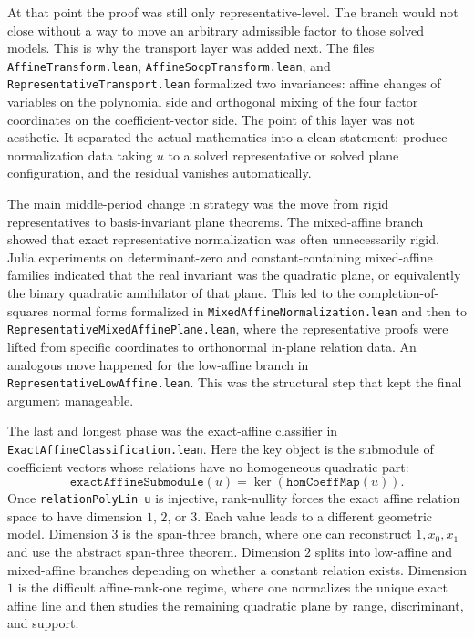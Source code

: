 \documentclass[10pt]{article}
\begin{document}
At that point the proof was still only representative-level. The branch would
not close without a way to move an arbitrary admissible factor to those solved
models. This is why the transport layer was added next. The files
\texttt{AffineTransform.lean}, \texttt{AffineSocpTransform.lean}, and
\texttt{RepresentativeTransport.lean} formalized two invariances: affine
changes of variables on the polynomial side and orthogonal mixing of the four
factor coordinates on the coefficient-vector side. The point of this layer was
not aesthetic. It separated the actual mathematics into a clean statement:
produce normalization data taking $u$ to a solved representative or solved
plane configuration, and the residual vanishes automatically.

The main middle-period change in strategy was the move from rigid
representatives to basis-invariant plane theorems. The mixed-affine branch
showed that exact representative normalization was often unnecessarily rigid.
Julia experiments on determinant-zero and constant-containing mixed-affine
families indicated that the real invariant was the quadratic plane, or
equivalently the binary quadratic annihilator of that plane. This led to the
completion-of-squares normal forms formalized in
\texttt{MixedAffineNormalization.lean} and then to
\texttt{RepresentativeMixedAffinePlane.lean}, where the representative proofs
were lifted from specific coordinates to orthonormal in-plane relation data.
An analogous move happened for the low-affine branch in
\texttt{RepresentativeLowAffine.lean}. This was the structural step that kept
the final argument manageable.

The last and longest phase was the exact-affine classifier in
\texttt{ExactAffineClassification.lean}. Here the key object is the submodule
of coefficient vectors whose relations have no homogeneous quadratic part:
\[
  \texttt{exactAffineSubmodule}(u)
  = \ker(\texttt{homCoeffMap}(u)).
\]
Once \texttt{relationPolyLin u} is injective, rank-nullity forces the exact
affine relation space to have dimension $1$, $2$, or $3$. Each value leads to
a different geometric model. Dimension $3$ is the span-three branch, where one
can reconstruct $1,x_0,x_1$ and use the abstract span-three theorem. Dimension
$2$ splits into low-affine and mixed-affine branches depending on whether a
constant relation exists. Dimension $1$ is the difficult affine-rank-one
regime, where one normalizes the unique exact affine line and then studies the
remaining quadratic plane by range, discriminant, and support.
\end{document}

